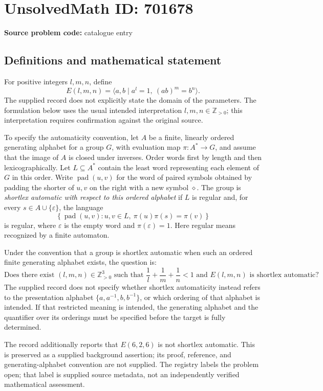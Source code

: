 \documentclass[11pt]{article}
\newcommand{\Z}{\mathbb{Z}}
\begin{document}
\section*{UnsolvedMath ID: 701678}
\textbf{Source problem code:} catalogue entry
\subsection{Definitions and mathematical statement}
For positive integers \(l,m,n\), define
\[
E(l,m,n)=\langle a,b\mid a^l=1,\ (ab)^m=b^n\rangle.
\]
The supplied record does not explicitly state the domain of the parameters. The formulation below uses the usual intended interpretation \(l,m,n\in\Z_{>0}\); this interpretation requires confirmation against the original source.

To specify the automaticity convention, let \(A\) be a finite, linearly ordered generating alphabet for a group \(G\), with evaluation map \(\pi:A^*\to G\), and assume that the image of \(A\) is closed under inverses. Order words first by length and then lexicographically. Let \(L\subseteq A^*\) contain the least word representing each element of \(G\) in this order. Write \(\operatorname{pad}(u,v)\) for the word of paired symbols obtained by padding the shorter of \(u,v\) on the right with a new symbol \(\diamond\). The group is \emph{shortlex automatic with respect to this ordered alphabet} if \(L\) is regular and, for every \(s\in A\cup\{\varepsilon\}\), the language
\[
\left\{\operatorname{pad}(u,v):u,v\in L,\ \pi(u)\pi(s)=\pi(v)\right\}
\]
is regular, where \(\varepsilon\) is the empty word and \(\pi(\varepsilon)=1\). Here regular means recognized by a finite automaton.

Under the convention that a group is shortlex automatic when such an ordered finite generating alphabet exists, the question is:
\[
\text{Does there exist }(l,m,n)\in\Z_{>0}^3
\text{ such that }\frac1l+\frac1m+\frac1n<1
\text{ and }E(l,m,n)\text{ is shortlex automatic?}
\]
The supplied record does not specify whether shortlex automaticity instead refers to the presentation alphabet \(\{a,a^{-1},b,b^{-1}\}\), or which ordering of that alphabet is intended. If that restricted meaning is intended, the generating alphabet and the quantifier over its orderings must be specified before the target is fully determined.

The record additionally reports that \(E(6,2,6)\) is not shortlex automatic. This is preserved as a supplied background assertion; its proof, reference, and generating-alphabet convention are not supplied. The registry labels the problem open; that label is supplied source metadata, not an independently verified mathematical assessment.
\end{document}
